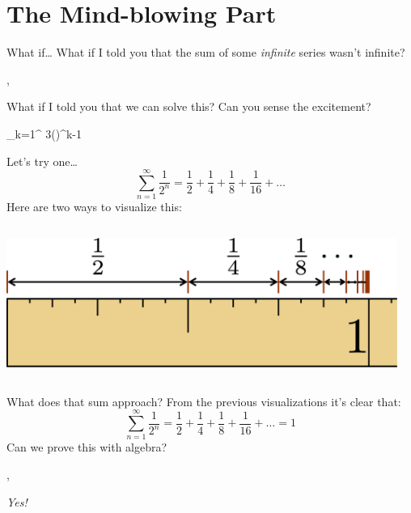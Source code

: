 	\section{The Mind-blowing Part}
	\begin{namedframe}{What if\dots}
		What if I told you that the sum of some \emph{infinite} series wasn't infinite?

		\sep

		What if I told you that we can solve this? Can you sense the excitement?

		\begin{sizedmath}{\Huge}
			\sum_{k=1}^{\infty} 3\left(\right)^{k-1}
		\end{sizedmath}
	\end{namedframe}
	\begin{namedframe}{Let's try one\dots}
		\[\sum_{n=1}^{\infty} \frac{1}{2^n} = \frac{1}{2} + \frac{1}{4} + \frac{1}{8} + \frac{1}{16} + \dots\]
		\pause
		Here are two ways to visualize this:
		\begin{columns}
			\begin{column}{0.5\textwidth}
				\includegraphics[width=\textwidth]{GeometricSegment}
			\end{column}
			\begin{column}{0.5\textwidth}
			\end{column}
		\end{columns}
	\end{namedframe}
	\begin{namedframe}{What does that sum approach?}
		From the previous visualizations it's clear that:
		\[\sum_{n=1}^{\infty} \frac{1}{2^n} = \frac{1}{2} + \frac{1}{4} + \frac{1}{8} + \frac{1}{16} + \dots = 1\]
		Can we prove this with algebra?

		\sep

		\emph{Yes!}
	\end{namedframe}
